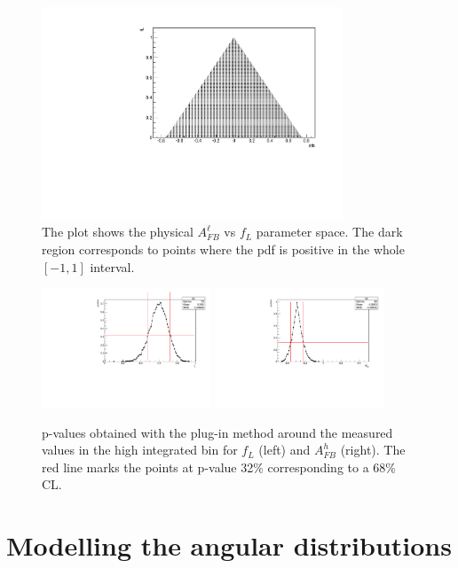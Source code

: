 \begin{figure}[h!]
\centering
\includegraphics[width=0.8\textwidth]{Lmumu/figs/scan.pdf}
\caption{The plot shows the physical $A_{FB}^\ell$ vs $f_L$ parameter space. The dark region corresponds to points where the pdf is positive in the whole $[-1,1]$ interval. }
\label{fig:pdfscan}
\end{figure}
%
\begin{figure}[h!]
\centering
\includegraphics[width=0.45\textwidth]{Lmumu/figs/pvalue_fL_1500_2000.pdf}
\includegraphics[width=0.45\textwidth]{Lmumu/figs/pvalue_afbB_1500_2000.pdf}
\caption{ p-values obtained with the plug-in method around the measured values in the 
high \qsq integrated bin for $f_{L}$ (left) and $A_{FB}^h$ (right).
The red line marks the points at p-value 32\% corresponding to a 68\% CL. }
\label{fig:FCexample}
\end{figure}

\section{Modelling the angular distributions}

